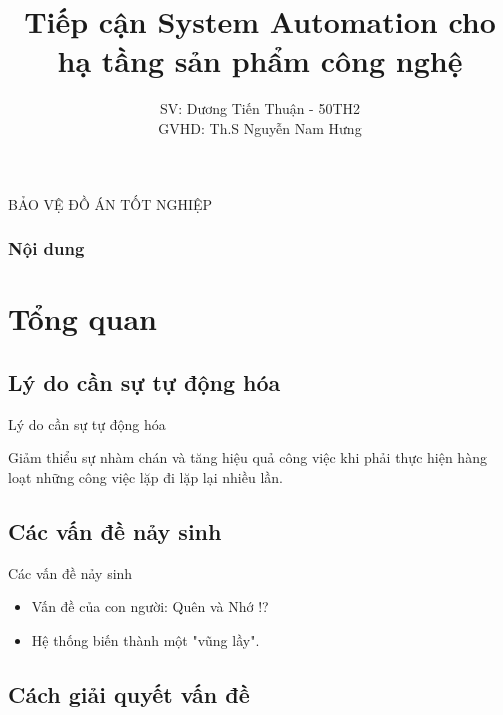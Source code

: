 \documentclass[14pt]{beamer}
\title[Tiếp cận System Automation cho hạ tầng sản phẩm công nghệ]{Tiếp cận System Automation cho hạ tầng sản phẩm công nghệ}
\author[Dương Tiến Thuận - 50TH2]{SV: Dương Tiến Thuận - 50TH2\\GVHD: Th.S Nguyễn Nam Hưng}
\begin{document}


\begin{frame}{BẢO VỆ ĐỒ ÁN TỐT NGHIỆP}
    \titlepage
\end{frame}

  \begin{frame}
    \frametitle{Nội dung}
    \tableofcontents
  \end{frame}

\section{Tổng quan}
\subsection*{Lý do cần sự tự động hóa}
\begin{frame}{Lý do cần sự tự động hóa}
  \begin{alertblock}\justifying
    \Large Giảm thiểu sự nhàm chán và tăng hiệu quả công việc khi phải thực hiện hàng loạt những công việc lặp đi lặp lại nhiều lần.
  \end{alertblock}
\end{frame}

\subsection*{Các vấn đề nảy sinh}

\begin{frame}{Các vấn đề nảy sinh}
\renewcommand{\baselinestretch}{1.50}\normalsize
  \begin{itemize}
    \item \large Vấn đề của con người: Quên và Nhớ !?
    \item \large Hệ thống biến thành một "vũng lầy".
  \end{itemize}
\renewcommand{\baselinestretch}{1.0}\normalsize
\end{frame}

\subsection{Cách giải quyết vấn đề}
\end{document}
